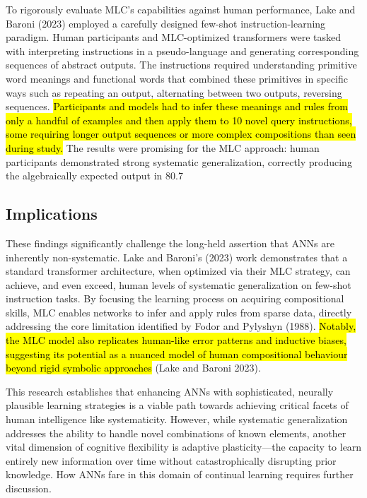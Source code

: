 \documentclass[
10pt, %
a4paper, %
oneside, %
headinclude,footinclude, %
BCOR5mm, %
]{scrartcl}
\begin{document}
To rigorously evaluate MLC's capabilities against human performance, Lake and Baroni (2023) employed a carefully designed few-shot instruction-learning paradigm. Human participants and MLC-optimized transformers were tasked with interpreting instructions in a pseudo-language and generating corresponding sequences of abstract outputs. The instructions required understanding primitive word meanings and functional words that combined these primitives in specific ways such as repeating an output, alternating between two outputs, reversing sequences. \hl{Participants and models had to infer these meanings and rules from only a handful of examples and then apply them to 10 novel query instructions, some requiring longer output sequences or more complex compositions than seen during study. } The results were promising for the MLC approach: human participants demonstrated strong systematic generalization, correctly producing the algebraically expected output in 80.7%

\subsection{Implications}

These findings significantly challenge the long-held assertion that ANNs are inherently non-systematic. Lake and Baroni's (2023) work demonstrates that a standard transformer architecture, when optimized via their MLC strategy, can achieve, and even exceed, human levels of systematic generalization on few-shot instruction tasks. By focusing the learning process on acquiring compositional skills, MLC enables networks to infer and apply rules from sparse data, directly addressing the core limitation identified by Fodor and Pylyshyn (1988). \hl{Notably, the MLC model also replicates human-like error patterns and inductive biases, suggesting its potential as a nuanced model of human compositional behaviour beyond rigid symbolic approaches} (Lake and Baroni 2023). 

This research establishes that enhancing ANNs with sophisticated, neurally plausible learning strategies is a viable path towards achieving critical facets of human intelligence like systematicity. However, while systematic generalization addresses the ability to handle novel combinations of known elements, another vital dimension of cognitive flexibility is adaptive plasticity—the capacity to learn entirely new information over time without catastrophically disrupting prior knowledge. How ANNs fare in this domain of continual learning requires further discussion.
\end{document}
